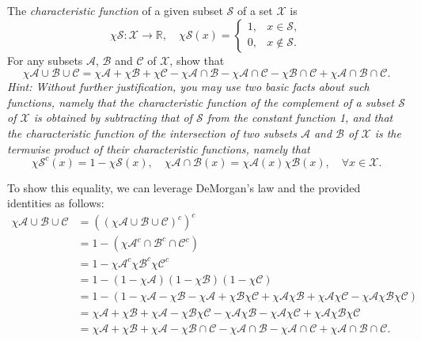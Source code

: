 \documentclass[12pt,letterpaper]{exam}
\begin{document}
\begin{questions}
\question
The \emph{characteristic function} of a given subset \(\mathcal{S}\) of a set \(\mathcal{X}\) is
\[
    \chi\mathcal{S}: \mathcal{X}\rightarrow\mathbb{R},\quad
    \chi\mathcal{S}(x)=
    \begin{cases}
        1, & x\in \mathcal{S},\\
        0, & x\notin \mathcal{S}.
    \end{cases}
\]
For any subsets \(\mathcal{A}\), \(\mathcal{B}\) and \(\mathcal{C}\) of \(\mathcal{X}\), show that
\[
    \chi\mathcal{A}\cup\mathcal{B}\cup\mathcal{C}
    = \chi\mathcal{A} + \chi\mathcal{B} + \chi\mathcal{C}
    - \chi\mathcal{A}\cap\mathcal{B} - \chi\mathcal{A}\cap\mathcal{C} 
    - \chi\mathcal{B}\cap\mathcal{C} + \chi\mathcal{A}\cap\mathcal{B}\cap\mathcal{C}.
\]
\emph{Hint: Without further justification, you may use two basic facts about such functions,
namely that the characteristic function of the complement of a subset \(\mathcal{S}\)
of \(\mathcal{X}\) is obtained by subtracting that of \(\mathcal{S}\) from the
constant function 1, and that the characteristic function of the intersection of two subsets
\(\mathcal{A}\) and \(\mathcal{B}\) of \(\mathcal{X}\) is
the termwise product of their characteristic functions, namely that}
\[
    \chi\mathcal{S}^c(x) = 1-\chi\mathcal{S}(x), \quad
    \chi\mathcal{A}\cap\mathcal{B}(x) = \chi\mathcal{A}(x) \chi\mathcal{B}(x), \quad
    \forall x\in\mathcal{X}.
\]
\begin{solution}
    To show this equality, we can leverage DeMorgan's law 
    and the provided identities as follows:
    \begin{align*}
        \chi\mathcal{A}\cup\mathcal{B}\cup\mathcal{C}
        &= \left(\left(\chi\mathcal{A}\cup\mathcal{B}\cup\mathcal{C}\right)^c\right)^c\\
        &= 1-\left(\chi\mathcal{A}^c\cap\mathcal{B}^c\cap\mathcal{C}^c\right)\\
        &= 1-\chi\mathcal{A}^c\chi\mathcal{B}^c\chi\mathcal{C}^c\\
        &= 1-(1-\chi\mathcal{A})(1-\chi\mathcal{B})(1-\chi\mathcal{C})\\
        &= 1-\left(1 - \chi\mathcal{A} - \chi\mathcal{B} - \chi\mathcal{A}
            + \chi\mathcal{B}\chi\mathcal{C} + \chi\mathcal{A}\chi\mathcal{B}
            + \chi\mathcal{A}\chi\mathcal{C} 
            -\chi\mathcal{A}\chi\mathcal{B}\chi\mathcal{C}\right)\\
        &= \chi\mathcal{A} + \chi\mathcal{B} + \chi\mathcal{A}
            - \chi\mathcal{B}\chi\mathcal{C} - \chi\mathcal{A}\chi\mathcal{B}
            - \chi\mathcal{A}\chi\mathcal{C}
            + \chi\mathcal{A}\chi\mathcal{B}\chi\mathcal{C} \\
        &= \chi\mathcal{A} + \chi\mathcal{B} + \chi\mathcal{A}
            - \chi\mathcal{B}\cap\mathcal{C} - \chi\mathcal{A}\cap\mathcal{B}
            - \chi\mathcal{A}\cap\mathcal{C}
            + \chi\mathcal{A}\cap\mathcal{B}\cap\mathcal{C}.\\
    \end{align*}
    

\end{solution}
\end{questions}
\end{document}
